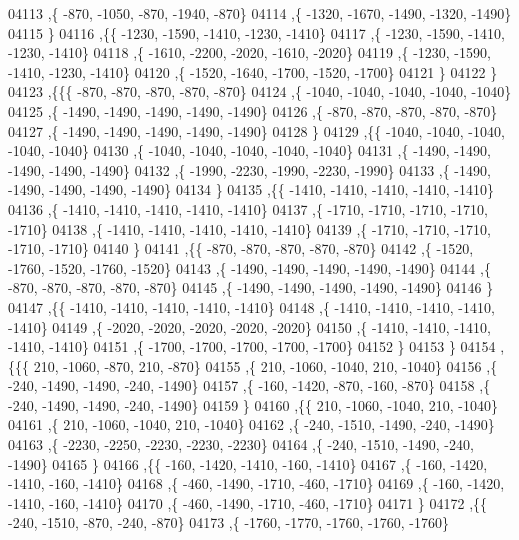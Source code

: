 \begin{DoxyCode}
04113     ,\{  -870, -1050,  -870, -1940,  -870\}
04114     ,\{ -1320, -1670, -1490, -1320, -1490\}
04115     \}
04116    ,\{\{ -1230, -1590, -1410, -1230, -1410\}
04117     ,\{ -1230, -1590, -1410, -1230, -1410\}
04118     ,\{ -1610, -2200, -2020, -1610, -2020\}
04119     ,\{ -1230, -1590, -1410, -1230, -1410\}
04120     ,\{ -1520, -1640, -1700, -1520, -1700\}
04121     \}
04122    \}
04123   ,\{\{\{  -870,  -870,  -870,  -870,  -870\}
04124     ,\{ -1040, -1040, -1040, -1040, -1040\}
04125     ,\{ -1490, -1490, -1490, -1490, -1490\}
04126     ,\{  -870,  -870,  -870,  -870,  -870\}
04127     ,\{ -1490, -1490, -1490, -1490, -1490\}
04128     \}
04129    ,\{\{ -1040, -1040, -1040, -1040, -1040\}
04130     ,\{ -1040, -1040, -1040, -1040, -1040\}
04131     ,\{ -1490, -1490, -1490, -1490, -1490\}
04132     ,\{ -1990, -2230, -1990, -2230, -1990\}
04133     ,\{ -1490, -1490, -1490, -1490, -1490\}
04134     \}
04135    ,\{\{ -1410, -1410, -1410, -1410, -1410\}
04136     ,\{ -1410, -1410, -1410, -1410, -1410\}
04137     ,\{ -1710, -1710, -1710, -1710, -1710\}
04138     ,\{ -1410, -1410, -1410, -1410, -1410\}
04139     ,\{ -1710, -1710, -1710, -1710, -1710\}
04140     \}
04141    ,\{\{  -870,  -870,  -870,  -870,  -870\}
04142     ,\{ -1520, -1760, -1520, -1760, -1520\}
04143     ,\{ -1490, -1490, -1490, -1490, -1490\}
04144     ,\{  -870,  -870,  -870,  -870,  -870\}
04145     ,\{ -1490, -1490, -1490, -1490, -1490\}
04146     \}
04147    ,\{\{ -1410, -1410, -1410, -1410, -1410\}
04148     ,\{ -1410, -1410, -1410, -1410, -1410\}
04149     ,\{ -2020, -2020, -2020, -2020, -2020\}
04150     ,\{ -1410, -1410, -1410, -1410, -1410\}
04151     ,\{ -1700, -1700, -1700, -1700, -1700\}
04152     \}
04153    \}
04154   ,\{\{\{   210, -1060,  -870,   210,  -870\}
04155     ,\{   210, -1060, -1040,   210, -1040\}
04156     ,\{  -240, -1490, -1490,  -240, -1490\}
04157     ,\{  -160, -1420,  -870,  -160,  -870\}
04158     ,\{  -240, -1490, -1490,  -240, -1490\}
04159     \}
04160    ,\{\{   210, -1060, -1040,   210, -1040\}
04161     ,\{   210, -1060, -1040,   210, -1040\}
04162     ,\{  -240, -1510, -1490,  -240, -1490\}
04163     ,\{ -2230, -2250, -2230, -2230, -2230\}
04164     ,\{  -240, -1510, -1490,  -240, -1490\}
04165     \}
04166    ,\{\{  -160, -1420, -1410,  -160, -1410\}
04167     ,\{  -160, -1420, -1410,  -160, -1410\}
04168     ,\{  -460, -1490, -1710,  -460, -1710\}
04169     ,\{  -160, -1420, -1410,  -160, -1410\}
04170     ,\{  -460, -1490, -1710,  -460, -1710\}
04171     \}
04172    ,\{\{  -240, -1510,  -870,  -240,  -870\}
04173     ,\{ -1760, -1770, -1760, -1760, -1760\}

\end{DoxyCode}
